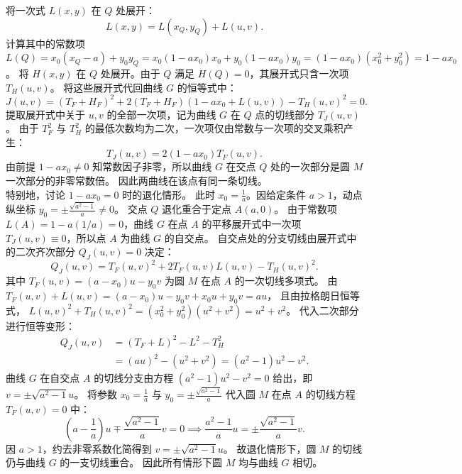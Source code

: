 \begin{solution}
将一次式 $L(x,y)$ 在 $Q$ 处展开：
\[ L(x,y) = L(x_Q, y_Q) + L(u,v). \]
计算其中的常数项 $L(Q) = x_0(x_Q - a) + y_0 y_Q = x_0(1 - a x_0)x_0 + y_0(1 - a x_0)y_0 = (1 - a x_0)(x_0^2 + y_0^2) = 1 - a x_0$。
将 $H(x,y)$ 在 $Q$ 处展开。由于 $Q$ 满足 $H(Q) = 0$，其展开式只含一次项 $T_H(u,v)$。
将这些展开式代回曲线 $G$ 的恒等式中：
\[ J(u,v) = (T_F + H_F)^2 + 2(T_F + H_F)(1 - a x_0 + L(u,v)) - T_H(u,v)^2 = 0. \]
提取展开式中关于 $u, v$ 的全部一次项，记为曲线 $G$ 在 $Q$ 点的切线部分 $T_J(u,v)$。
由于 $T_F^2$ 与 $T_H^2$ 的最低次数均为二次，一次项仅由常数与一次项的交叉乘积产生：
\[ T_J(u,v) = 2(1 - a x_0) T_F(u,v). \]
由前提 $1 - a x_0 \neq 0$ 知常数因子非零，所以曲线 $G$ 在交点 $Q$ 处的一次部分是圆 $M$ 一次部分的非零常数倍。
因此两曲线在该点有同一条切线。\\
特别地，讨论 $1 - a x_0 = 0$ 时的退化情形。
此时 $x_0 = \frac{1}{a}$。因给定条件 $a > 1$，动点纵坐标 $y_0 = \pm\frac{\sqrt{a^2 - 1}}{a} \neq 0$。
交点 $Q$ 退化重合于定点 $A(a,0)$。
由于常数项 $L(A) = 1 - a(1/a) = 0$，曲线 $G$ 在点 $A$ 的平移展开式中一次项 $T_J(u,v) \equiv 0$，所以点 $A$ 为曲线 $G$ 的自交点。
自交点处的分支切线由展开式中的二次齐次部分 $Q_J(u,v) = 0$ 决定：
\[ Q_J(u,v) = T_F(u,v)^2 + 2 T_F(u,v) L(u,v) - T_H(u,v)^2. \]
其中 $T_F(u,v) = (a - x_0)u - y_0 v$ 为圆 $M$ 在点 $A$ 的一次切线多项式。
由 $T_F(u,v) + L(u,v) = (a - x_0)u - y_0 v + x_0 u + y_0 v = a u$，
且由拉格朗日恒等式， $L(u,v)^2 + T_H(u,v)^2 = (x_0^2 + y_0^2)(u^2 + v^2) = u^2 + v^2$。
代入二次部分进行恒等变形：
\begin{align*}
Q_J(u,v) &= (T_F + L)^2 - L^2 - T_H^2 \\
&= (a u)^2 - (u^2 + v^2) = (a^2 - 1)u^2 - v^2.
\end{align*}
曲线 $G$ 在自交点 $A$ 的切线分支由方程 $(a^2 - 1)u^2 - v^2 = 0$ 给出，即 $v = \pm\sqrt{a^2 - 1}u$。
将参数 $x_0 = \frac{1}{a}$ 与 $y_0 = \pm\frac{\sqrt{a^2 - 1}}{a}$ 代入圆 $M$ 在点 $A$ 的切线方程 $T_F(u,v) = 0$ 中：
\[ \left(a - \frac{1}{a}\right)u \mp \frac{\sqrt{a^2 - 1}}{a} v = 0 \implies \frac{a^2 - 1}{a}u = \pm\frac{\sqrt{a^2 - 1}}{a} v. \]
因 $a > 1$，约去非零系数化简得到 $v = \pm\sqrt{a^2 - 1}u$。
故退化情形下，圆 $M$ 的切线仍与曲线 $G$ 的一支切线重合。
因此所有情形下圆 $M$ 均与曲线 $G$ 相切。
\end{solution}


